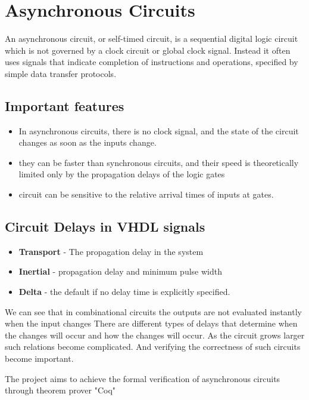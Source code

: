 \chapter{Asynchronous Circuits}
An asynchronous circuit, or self-timed circuit, is a sequential digital logic circuit 
which is not governed by a clock circuit or global clock signal. 
Instead it often uses signals that indicate completion of instructions and operations, 
specified by simple data transfer protocols.

\section{Important features}
\begin{itemize}
    \item In asynchronous circuits, there is no clock signal, 
    and the state of the circuit changes as soon as the inputs change.
    \item they can be faster than synchronous circuits,
     and their speed is theoretically limited only by the propagation delays of the logic gates
    \item circuit can be sensitive to the relative arrival times of inputs at gates.
\end{itemize}

\section{Circuit Delays in VHDL signals}
\begin{itemize}
    \item \textbf{Transport} - The propagation delay in the system
    \item \textbf{Inertial} - propagation delay and minimum pulse width
    \item \textbf{Delta} - the default if no delay time is explicitly specified.
\end{itemize}
\par We can see that in combinational circuits the outputs are not evaluated instantly when the input changes
There are different types of delays that determine when the changes will occur and how the changes will
occur. As the circuit grows larger such relations become complicated. And verifying the correctness of 
such circuits become important. 

\par The project aims to achieve the formal verification of asynchronous circuits through theorem
prover "Coq"